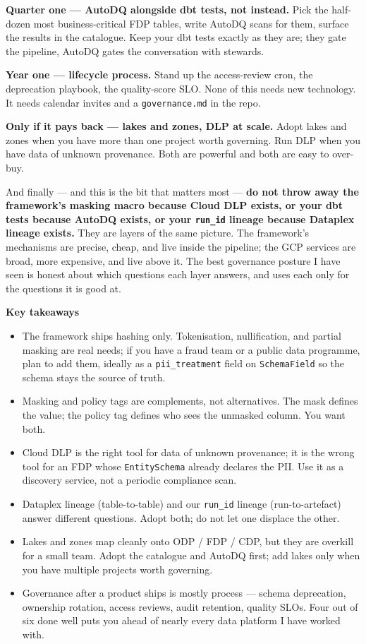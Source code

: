 \documentclass[
  11pt,
  british,
  oneside]{book}
\begin{document}
\textbf{Quarter one --- AutoDQ alongside dbt tests, not instead.} Pick
the half-dozen most business-critical FDP tables, write AutoDQ scans for
them, surface the results in the catalogue. Keep your dbt tests exactly
as they are; they gate the pipeline, AutoDQ gates the conversation with
stewards.

\textbf{Year one --- lifecycle process.} Stand up the access-review
cron, the deprecation playbook, the quality-score SLO. None of this
needs new technology. It needs calendar invites and a
\texttt{governance.md} in the repo.

\textbf{Only if it pays back --- lakes and zones, DLP at scale.} Adopt
lakes and zones when you have more than one project worth governing. Run
DLP when you have data of unknown provenance. Both are powerful and both
are easy to over-buy.

And finally --- and this is the bit that matters most --- \textbf{do not
throw away the framework's masking macro because Cloud DLP exists, or
your dbt tests because AutoDQ exists, or your \texttt{run\_id} lineage
because Dataplex lineage exists.} They are layers of the same picture.
The framework's mechanisms are precise, cheap, and live inside the
pipeline; the GCP services are broad, more expensive, and live above it.
The best governance posture I have seen is honest about which questions
each layer answers, and uses each only for the questions it is good at.

\begin{takeaways}
\textbf{Key takeaways}
\begin{itemize}
  \item The framework ships hashing only. Tokenisation, nullification, and partial masking are real needs; if you have a fraud team or a public data programme, plan to add them, ideally as a \texttt{pii\_treatment} field on \texttt{SchemaField} so the schema stays the source of truth.
  \item Masking and policy tags are complements, not alternatives. The mask defines the value; the policy tag defines who sees the unmasked column. You want both.
  \item Cloud DLP is the right tool for data of unknown provenance; it is the wrong tool for an FDP whose \texttt{EntitySchema} already declares the PII. Use it as a discovery service, not a periodic compliance scan.
  \item Dataplex lineage (table-to-table) and our \texttt{run\_id} lineage (run-to-artefact) answer different questions. Adopt both; do not let one displace the other.
  \item Lakes and zones map cleanly onto ODP / FDP / CDP, but they are overkill for a small team. Adopt the catalogue and AutoDQ first; add lakes only when you have multiple projects worth governing.
  \item Governance after a product ships is mostly process — schema deprecation, ownership rotation, access reviews, audit retention, quality SLOs. Four out of six done well puts you ahead of nearly every data platform I have worked with.
\end{itemize}
\end{takeaways}
\newpage
\end{document}
